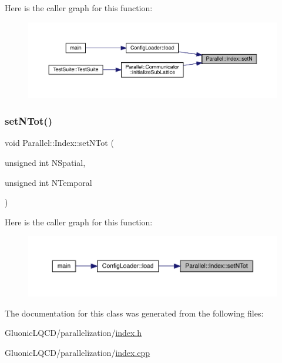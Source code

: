Here is the caller graph for this function\+:
\nopagebreak
\begin{figure}[H]
\begin{center}
\leavevmode
\includegraphics[width=350pt]{class_parallel_1_1_index_ab8650936d7000d54b811dd128618f9ad_icgraph}
\end{center}
\end{figure}
\mbox{\label{class_parallel_1_1_index_a14d1d30c926a76761ed1a1a51912a516}} 
\subsubsection{\texorpdfstring{setNTot()}{setNTot()}}
{\footnotesize\ttfamily void Parallel\+::\+Index\+::set\+N\+Tot (\begin{DoxyParamCaption}\item[{unsigned int}]{N\+Spatial,  }\item[{unsigned int}]{N\+Temporal }\end{DoxyParamCaption})\hspace{0.3cm}{\ttfamily [static]}}

Here is the caller graph for this function\+:
\nopagebreak
\begin{figure}[H]
\begin{center}
\leavevmode
\includegraphics[width=350pt]{class_parallel_1_1_index_a14d1d30c926a76761ed1a1a51912a516_icgraph}
\end{center}
\end{figure}


The documentation for this class was generated from the following files\+:\begin{DoxyCompactItemize}
\item 
Gluonic\+L\+Q\+C\+D/parallelization/\mbox{\hyperlink{index_8h}{index.\+h}}\item 
Gluonic\+L\+Q\+C\+D/parallelization/\mbox{\hyperlink{index_8cpp}{index.\+cpp}}\end{DoxyCompactItemize}
